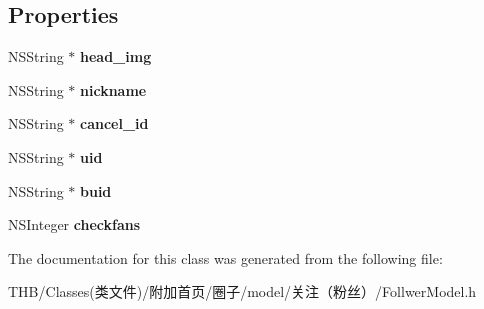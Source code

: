 \subsection*{Properties}
\begin{DoxyCompactItemize}
\item 
\mbox{\label{interface_follwer_model_a314abc5cb98ffeae688806af827931b8}} 
N\+S\+String $\ast$ {\bfseries head\+\_\+img}
\item 
\mbox{\label{interface_follwer_model_a5c02dc4921c62d0b53685076018b4fb0}} 
N\+S\+String $\ast$ {\bfseries nickname}
\item 
\mbox{\label{interface_follwer_model_a94962a743c8dfa882d297b86ee318c9b}} 
N\+S\+String $\ast$ {\bfseries cancel\+\_\+id}
\item 
\mbox{\label{interface_follwer_model_a183bfcc630cf7456c31fc17655f1879d}} 
N\+S\+String $\ast$ {\bfseries uid}
\item 
\mbox{\label{interface_follwer_model_a52a85bf6c32ed71741883794e3398734}} 
N\+S\+String $\ast$ {\bfseries buid}
\item 
\mbox{\label{interface_follwer_model_a220196a146df2ae5ef91c81f289a5a69}} 
N\+S\+Integer {\bfseries checkfans}
\end{DoxyCompactItemize}


The documentation for this class was generated from the following file\+:\begin{DoxyCompactItemize}
\item 
T\+H\+B/\+Classes(类文件)/附加首页/圈子/model/关注（粉丝）/Follwer\+Model.\+h\end{DoxyCompactItemize}
